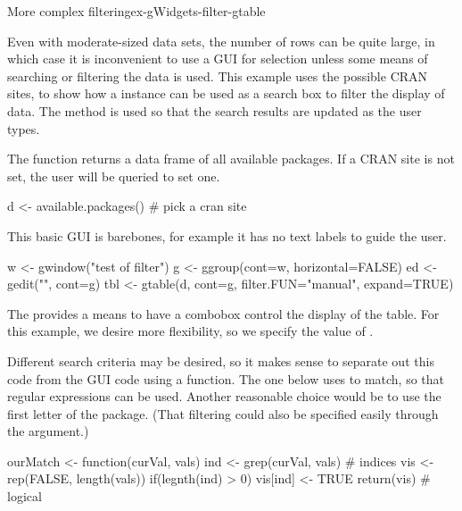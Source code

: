 \begin{example}{More complex filtering}{ex-gWidgets-filter-gtable}

Even with moderate-sized data sets, the number of rows can be quite large, in which case it is
inconvenient to use a GUI for selection unless some means of searching or filtering the
data is used. This example uses the possible CRAN sites, to show how a
 instance can be used as a search box to filter the display of
data. The  method is used so that the search
results are updated as the user types.


The  function returns a data frame of all
available packages. If a CRAN site is not set, the user will be
queried to set one.
\begin{Schunk}
\begin{Sinput}
 d <- available.packages()       # pick a cran site
\end{Sinput}
\end{Schunk}

This basic GUI is barebones, for example it has no text labels to guide the user. 
\begin{Schunk}
\begin{Sinput}
 w <- gwindow("test of filter")
 g <- ggroup(cont=w, horizontal=FALSE)
 ed <- gedit("", cont=g)
 tbl <- gtable(d, cont=g, filter.FUN="manual", expand=TRUE)
\end{Sinput}
\end{Schunk}
The  provides a means to have a combobox
control the display of the table. For this example, we desire more
flexibility, so we specify the value of .

Different search criteria may be desired, so it makes sense to
separate out this code from the GUI code using a function. The one below
uses  to match, so that regular expressions can be
used. Another reasonable choice would be to use the first letter of
the package. (That filtering could also be specified easily through the
 argument.)

\begin{Schunk}
\begin{Sinput}
 ourMatch <- function(curVal, vals) {
   ind <- grep(curVal, vals)             # indices
   vis <- rep(FALSE, length(vals))
   if(legnth(ind) > 0)
     vis[ind] <- TRUE
   return(vis)                           # logical
 }
\end{Sinput}
\end{Schunk}


\end{example}
